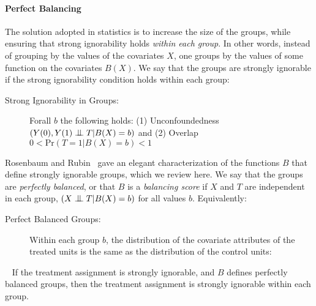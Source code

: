 \paragraph*{Perfect Balancing}
The solution adopted in statistics is to increase the size of the
groups, while ensuring that strong ignorability holds {\em within each
  group}.  In other words, instead of grouping by the values of the
covariates $X$, one groups by the values of some function on the
covariates $B(X)$.  We say that the groups are strongly ignorable if
the strong ignorability condition holds within each group: \vspace{-0.1cm}
\begin{description}
\item[Strong Ignorability in Groups:] Forall $b$ the following holds:
%
  \newline (1) Unconfoundedness $({Y(0), Y(1) \bigCI T} | B(X)=b)$ and
%
  \newline (2) Overlap $0 < \textrm{Pr}(T = 1 | B(X)=b) < 1$
\end{description}
Rosenbaum and Rubin~\cite{Rubin1983b} gave an elegant characterization
of the functions $B$ that define strongly ignorable groups, which we
review here.  We say that the groups are {\em perfectly balanced}, or
that $B$ is a {\em balancing score} if $X$ and $T$ are independent in
each group, \ie $({X \bigCI T} | B(X)=b)$ for all values $b$.
Equivalently: \vspace{-0.2cm}
\begin{description}
\item[Perfect Balanced Groups:] Within each group $b$, the
  distribution of the covariate attributes of the treated units is the
  same as the distribution of the control units:

\end{description}
\vspace{-0.7cm} \begin{theorem}~\cite[Th.3]{Rubin1983b} \label{the:sib} If the
  treatment assignment is strongly ignorable, and $B$ defines
  perfectly balanced groups, then the treatment assignment is strongly
  ignorable within each group.
\end{theorem}
